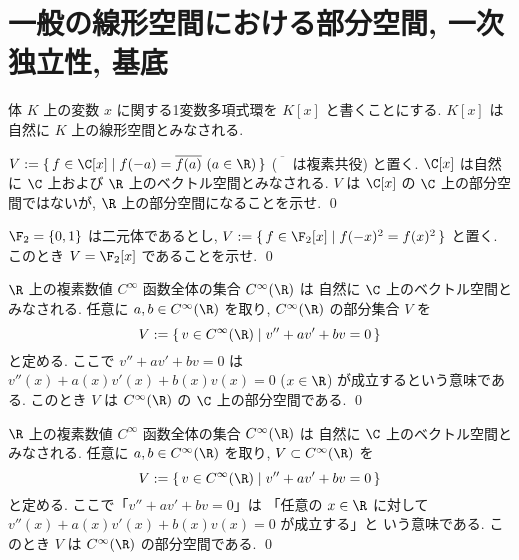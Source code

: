 \documentclass[12pt,twoside]{jarticle}
\newcommand\commentout[1]{#1}
\newcommand\commentout[1]{}
\begin{document}





\section{一般の線形空間における部分空間, 一次独立性, 基底}

体 $K$ 上の変数 $x$ に関する1変数多項式環を $K[x]$ と書くことにする.
$K[x]$ は自然に $K$ 上の線形空間とみなされる.

\begin{question}[5点]
  $V := \{\, f\in\C[x] \mid f(-a)=\overline{f(a)}\ (a\in\R) \,\}$ %
  ($\overline{\phantom{A}}$ は複素共役) と置く.
  $\C[x]$ は自然に $\C$ 上および $\R$ 上のベクトル空間とみなされる.
  $V$ は $\C[x]$ の $\C$ 上の部分空間ではないが, %
  $\R$ 上の部分空間になることを示せ.
  \qed
\end{question}

\begin{question}[5点]
  $\F_2=\{0,1\}$ は二元体であるとし, %
  $V:=\{\, f\in\F_2[x] \mid f(-x)^2=f(x)^2\,\}$ と置く.
  このとき $V=\F_2[x]$ であることを示せ.
  \qed
\end{question}

\begin{question}[5点]
  $\R$ 上の複素数値 $C^\infty$ 函数全体の集合 $C^\infty(\R)$ は
  自然に $\C$ 上のベクトル空間とみなされる.
  任意に $a,b\in C^\infty(\R)$ を取り, $C^\infty(\R)$ の部分集合 $V$ を
  \begin{equation*}
    V := \{\, v\in C^\infty(\R)
    \mid v''+ av'+ bv = 0 \,\}
  \end{equation*}
  と定める. ここで $v''+ av'+ bv = 0$ は %
  $v''(x)+ a(x)v'(x)+ b(x)v(x) = 0$ ($x\in\R$) が成立するという意味である.
  このとき $V$ は $C^\infty(\R)$ の $\C$ 上の部分空間である.
  \qed
\end{question}

\begin{question}[二階の線形常微分方程式の解空間, 5点]
  \label{q:ODE-a,b}
  $\R$ 上の複素数値 $C^\infty$ 函数全体の集合 $C^\infty(\R)$ は
  自然に $\C$ 上のベクトル空間とみなされる.
  任意に $a,b\in C^\infty(\R)$ を取り, $V\subset C^\infty(\R)$ を
  \begin{equation*}
    V := \{\, v\in C^\infty(\R) \mid v''+ av'+ bv = 0 \,\}
  \end{equation*}
  と定める. ここで「$v''+ av'+ bv = 0$」は %
  「任意の $x\in \R$ に対して $v''(x)+ a(x)v'(x)+ b(x)v(x) = 0$ が成立する」と
  いう意味である. このとき $V$ は $C^\infty(\R)$ の部分空間である.
  \qed
\end{question}
\end{document}
